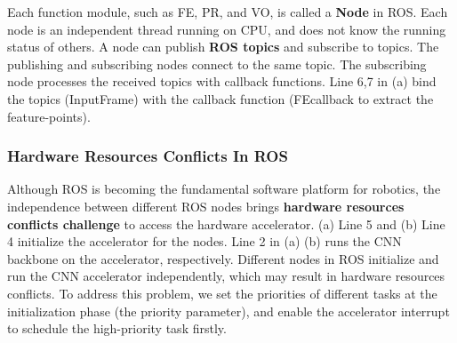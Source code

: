 Each function module, such as FE, PR, and VO, is called a \textbf{Node} in ROS. Each node is an independent thread running on CPU, and does not know the running status of others. 
A node can publish \textbf{ROS topics} and subscribe to topics. The publishing and subscribing nodes connect to the same topic.
The subscribing node processes the received topics with callback functions. Line 6,7 in (a) bind the topics (InputFrame) with the callback function (FEcallback to extract the feature-points). 






 


\subsubsection{Hardware Resources Conflicts In ROS} Although ROS is becoming the fundamental software platform for robotics, the independence between different ROS nodes brings \textbf{hardware resources conflicts challenge} to access the hardware accelerator. 
(a) Line 5 and (b) Line 4 initialize the accelerator for the nodes. Line 2 in (a) (b) runs the CNN backbone on the accelerator, respectively. Different nodes in ROS initialize and run the CNN accelerator independently, which may result in hardware resources conflicts. To address this problem, we set the priorities of different tasks at the initialization phase (the {\color{red}priority} parameter), and enable the accelerator interrupt to schedule the high-priority task firstly.

